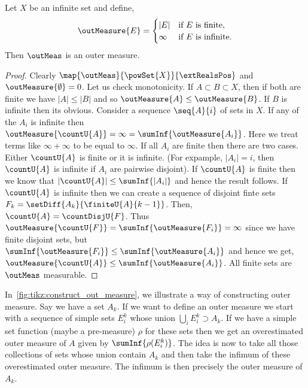\begin{Example}\label{ex:out_meas}
    Let $X$ be an infinite set and define,
    \begin{equation*}
	\outMeasure{E} =
	\begin{cases}
	    \lvert E \rvert& \text{if $E$ is finite},\\
	    \infty& \text{if $E$ is infinite}.
	\end{cases}
    \end{equation*}
    Then $\outMeas$ is an outer measure.
\end{Example}
\begin{proof}
    Clearly $\map{\outMeas}{\powSet{X}}{\extRealsPos}$ and $\outMeasure{\emptyset} = 0$. Let us check
    monotonicity. If $A \subset B \subset X$, then if both are finite we have 
    $\lvert A \rvert \leq \lvert B \rvert$ and so $\outMeasure{A} \leq \outMeasure{B}$. If $B$ is
    infinite then its obvious.
    Consider a sequence $\seq{A}{i}$ of sets in $X$. If any of the $A_i$ is infinite then 
    $\outMeasure{\countU{A}} = \infty = \sumInf{\outMeasure{A_i}}$. Here we treat terms like $\infty +
    \infty$ to be equal to $\infty$. If all $A_i$ are finite then there are two cases. Either
    $\countU{A}$ is finite or it is infinite. (For expample, $\lvert A_i \rvert = i$, then
    $\countU{A}$ is infinite if $A_i$ are pairwise disjoint). 
    If $\countU{A}$ is finite then we know that $\lvert \countU{A} \rvert
    \leq \sumInf{\lvert A_i \rvert}$ and hence the result follows. If $\countU{A}$ is infinite then
    we can create a sequence of disjoint finte sets $F_k = \setDiff{A_k}{\finiteU{A}{k-1}}$. Then,
    $\countU{A} = \countDisjU{F}$. Thus 
    $\outMeasure{\countU{F}} = \sumInf{\outMeasure{F_i}} = \infty$ since we have finite disjoint
    sets, but $\sumInf{\outMeasure{F_i}}
    \leq \sumInf{\outMeasure{A_i}}$ and hence we get,
    $\outMeasure{\countU{A}} \leq \sumInf{\outMeasure{A_i}}$. All finite sets are $\outMeas$
    measurable.
\end{proof}

In~\ref{fig:tikz:construct_out_measure}, we illustrate a way of constructing outer measure. Say we
have a set $A_k$. If we want to define an outer measure we start with a sequence of 
simple sets $E^{k}_i$ whose union $\bigcup\limits_{i}E^{k}_{i} \supset A_k$. If we have a simple
set function (maybe a pre-measure) $\rho$ for these sets then we get an overestimated outer measure 
of $A$ given by 
$\sumInf{\rho(E^k_i)}$. The idea is now to take all those collections of sets whose union contain 
$A_k$ and then take the infimum of these overestimated outer measure. The infimum is then precisely
the outer measure of $A_k$.


